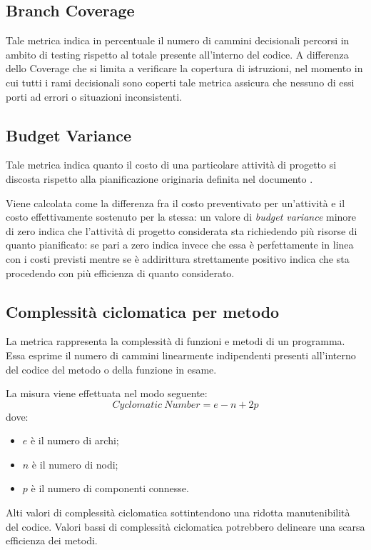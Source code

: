 \subsection{Branch Coverage}
Tale metrica indica in percentuale il numero di cammini decisionali percorsi in ambito di testing rispetto al totale presente all'interno del codice. A differenza dello  Coverage che si limita a verificare la copertura di istruzioni, nel momento in cui tutti i rami decisionali sono coperti tale metrica assicura che nessuno di essi porti ad errori o situazioni inconsistenti.

\subsection{Budget Variance}
Tale metrica indica quanto il costo di una particolare attività di progetto si discosta rispetto alla pianificazione originaria definita nel documento \PdP. 

Viene calcolata come la differenza fra il costo preventivato per un'attività e il costo effettivamente sostenuto per la stessa: un valore di \emph{budget variance} minore di zero indica che l'attività di progetto considerata sta richiedendo più risorse di quanto pianificato: se pari a zero indica invece che essa è perfettamente in linea con i costi previsti mentre se è addirittura strettamente positivo indica che sta procedendo con più efficienza di quanto considerato.

\subsection{Complessità ciclomatica per metodo}
La metrica rappresenta la complessità di funzioni e metodi di un programma. Essa esprime il numero di cammini linearmente indipendenti presenti all'interno del codice del metodo o della funzione in esame. 

La misura viene effettuata nel modo seguente:
\begin{equation}
	Cyclomatic \ Number = e - n + 2p
\end{equation}
dove:
\begin{itemize}
	\item $e$ è il numero di archi;
	\item $n$ è il numero di nodi;
	\item $p$ è il numero di componenti connesse.
\end{itemize}
Alti valori di complessità ciclomatica sottintendono una ridotta manutenibilità del codice. Valori bassi di complessità ciclomatica potrebbero delineare una scarsa efficienza dei metodi.

